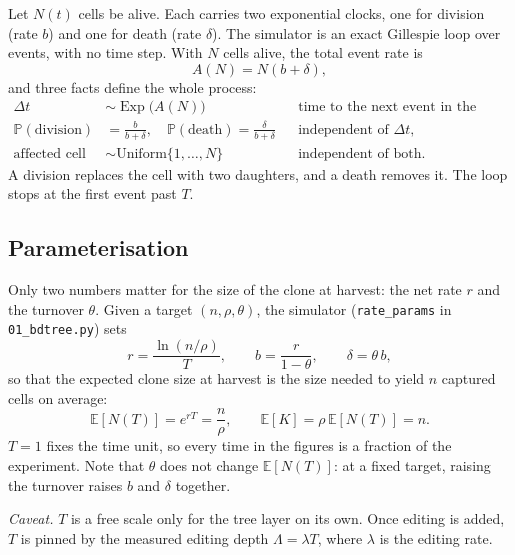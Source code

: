 \documentclass[11pt]{article}
\newcommand{\bdrate}{b}          %
\newcommand{\dthrate}{\delta}    %
\newcommand{\turn}{\theta}       %
\newcommand{\net}{r}             %
\newcommand{\capt}{\rho}         %
\newcommand{\E}{\mathbb{E}}
\newcommand{\Prob}{\mathbb{P}}
\DeclareMathOperator{\Exp}{Exp}
\begin{document}
Let $N(t)$ cells be alive. Each carries two exponential clocks, one for division (rate
$\bdrate$) and one for death (rate $\dthrate$). The simulator is an exact Gillespie loop over
events, with no time step. With $N$ cells alive, the total event rate is
\begin{equation}
  A(N) = N(\bdrate+\dthrate),
  \label{eq:propensity}
\end{equation}
and three facts define the whole process:
\begin{align}
  \Delta t &\sim \Exp\!\big(A(N)\big)
    && \text{time to the next event in the clone,} \label{eq:wait}\\
  \Prob(\text{division}) &= \frac{\bdrate}{\bdrate+\dthrate},
  \quad \Prob(\text{death}) = \frac{\dthrate}{\bdrate+\dthrate}
    && \text{independent of $\Delta t$,} \label{eq:type}\\
  \text{affected cell} &\sim \text{Uniform}\{1,\dots,N\}
    && \text{independent of both.} \label{eq:who}
\end{align}
A division replaces the cell with two daughters, and a death removes it. The loop stops at the
first event past $T$.

\subsection{Parameterisation}

Only two numbers matter for the size of the clone at harvest: the net rate $\net$ and the
turnover $\turn$. Given a target $(n,\capt,\turn)$, the simulator (\texttt{rate\_params} in
\texttt{01\_bdtree.py}) sets
\begin{equation}
  \net = \frac{\ln(n/\capt)}{T}, \qquad
  \bdrate = \frac{\net}{1-\turn}, \qquad
  \dthrate = \turn\,\bdrate,
  \label{eq:params}
\end{equation}
so that the expected clone size at harvest is the size needed to yield $n$ captured cells on
average:
\begin{equation}
  \E[N(T)] = e^{\net T} = \frac{n}{\capt}, \qquad \E[K] = \capt\,\E[N(T)] = n .
  \label{eq:mean}
\end{equation}
$T=1$ fixes the time unit, so every time in the figures is a fraction of the experiment. Note
that $\turn$ does not change $\E[N(T)]$: at a fixed target, raising the turnover raises
$\bdrate$ and $\dthrate$ together.

\emph{Caveat.} $T$ is a free scale only for the tree layer on its own. Once editing is added, $T$
is pinned by the measured editing depth $\Lambda=\lambda T$, where $\lambda$ is the editing rate.
\end{document}
